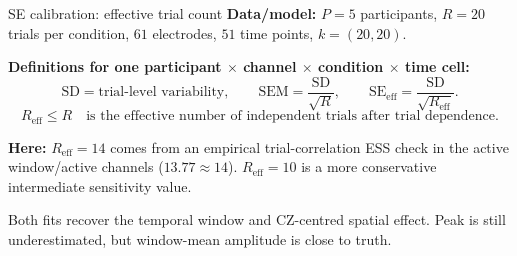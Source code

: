 \documentclass{beamer}
\begin{document}
\begin{frame}{SE calibration: effective trial count}
\scriptsize
\textbf{Data/model:} $P=5$ participants, $R=20$ trials per condition,
$61$ electrodes, $51$ time points, $k=(20,20)$.

\medskip
\textbf{Definitions for one participant $\times$ channel $\times$ condition $\times$ time cell:}
\[
\mathrm{SD} = \text{trial-level variability},
\qquad
\mathrm{SEM} = \frac{\mathrm{SD}}{\sqrt{R}},
\qquad
\mathrm{SE}_{\mathrm{eff}} = \frac{\mathrm{SD}}{\sqrt{R_{\mathrm{eff}}}}.
\]
\vspace{-0.5em}
\[
R_{\mathrm{eff}} \leq R
\quad\text{is the effective number of independent trials after trial dependence.}
\]

\smallskip
\textbf{Here:} $R_{\mathrm{eff}}=14$ comes from an empirical trial-correlation
ESS check in the active window/active channels ($13.77 \approx 14$).
$R_{\mathrm{eff}}=10$ is a more conservative intermediate sensitivity value.

\medskip
\begin{center}
\renewcommand{\arraystretch}{1.18}
\end{center}

\medskip
Both fits recover the temporal window and CZ-centred spatial effect. Peak is
still underestimated, but window-mean amplitude is close to truth.
\end{frame}
\end{document}
